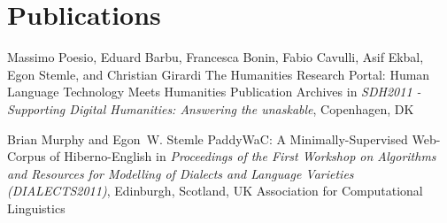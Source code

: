 \documentclass[11pt,a4paper]{moderncv}
\begin{document}

%
%


%
%

\section{Publications}

    {Massimo Poesio, Eduard Barbu, Francesca Bonin, Fabio Cavulli, Asif Ekbal,
    Egon Stemle, and Christian Girardi}
    {\small The Humanities Research Portal: Human Language Technology Meets
    Humanities Publication Archives}
    {\small in {\em SDH2011 - Supporting Digital Humanities: Answering the 
    unaskable}, Copenhagen, DK}
    {}
    {}

    {Brian Murphy and Egon~W. Stemle}
    {\small PaddyWaC: A Minimally-Supervised Web-Corpus of Hiberno-English}
    {\small in {\em Proceedings of the First Workshop on Algorithms and Resources
    for Modelling of Dialects and Language Varieties (DIALECTS2011)}, Edinburgh, Scotland, UK}
    {\small Association for Computational Linguistics}
    {}
\end{document}
